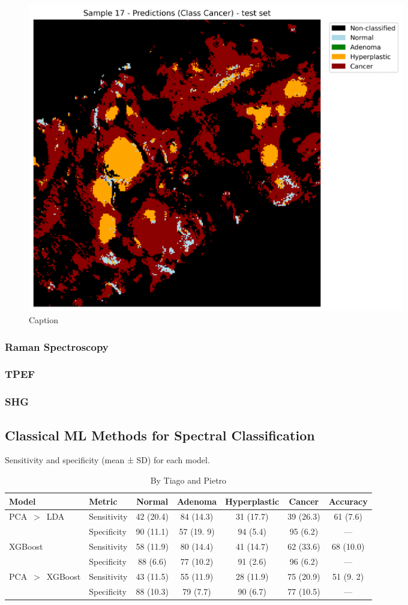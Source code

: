 \begin{figure}[htbp]
  \centering
  \includegraphics[width=0.8\textwidth]{Images/Predicton_17.png}
  \caption{Caption}
  \label{fig:my-label}
\end{figure}

\subsubsection{Raman Spectroscopy}
\subsubsection{TPEF}
\subsubsection{SHG}

\subsection{Classical ML Methods for Spectral Classification}

\begin{table}[ht] \centering \caption{Sensitivity and specificity (mean ± SD)
for each model.} \label{tab:model_performance} \begin{tabular}{@{}l l c c c c
c@{}} \toprule Model & Metric & Normal & Adenoma & Hyperplastic & Cancer &
Accuracy \\ \midrule \multirow{2}{*}{PCA~$>$~LDA} & Sensitivity & 42 (20.4) & 84
(14.3) & 31 (17.7) & 39 (26.3) & 61 (7.6) \\ & Specificity & 90 (11.1) & 57 (19.
9) & 94 (5.4) & 95 (6.2) & — \\ \midrule \multirow{2}{*}{XGBoost} & Sensitivity
& 58 (11.9) & 80 (14.4) & 41 (14.7) & 62 (33.6) & 68 (10.0) \\ & Specificity &
88 (6.6) & 77 (10.2) & 91 (2.6) & 96 (6.2) & — \\ \midrule \multirow{2}{*}{PCA~$>$~XGBoost} & Sensitivity & 43 (11.5) & 55 (11.9) & 28 (11.9) & 75 (20.9) & 51 (9.
2) \\ & Specificity & 88 (10.3) & 79 (7.7) & 90 (6.7) & 77 (10.5) & — \\
\bottomrule \end{tabular} 
\caption{By Tiago and Pietro}
\end{table} 


